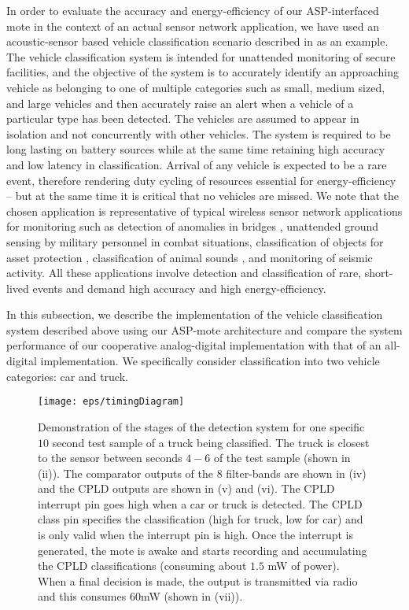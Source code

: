 In order to evaluate the accuracy and energy-efficiency of our ASP-interfaced mote in the context of an actual sensor network application, we have used an acoustic-sensor based vehicle classification scenario described in \cite{lanl} as an example. The vehicle classification system is intended for unattended monitoring of secure facilities, and the objective of the system is to accurately identify an approaching vehicle as belonging to one of multiple categories such as small, medium sized, and large vehicles and then accurately raise an alert when a vehicle of a particular type has been detected. The vehicles are assumed to appear in isolation and not concurrently with other vehicles. The system is required to be long lasting on battery sources while at the same time retaining high accuracy and low latency in classification. Arrival of any vehicle is expected to be a rare event, therefore rendering duty cycling of resources essential for energy-efficiency -- but at the same time it is critical that no vehicles are missed. We note that the chosen application is representative of typical wireless sensor network applications for monitoring such as detection of anomalies in bridges \cite{struct_rice}, unattended ground sensing by military personnel in combat situations, classification of objects for asset protection \cite{lites}, classification of animal sounds \cite{acoustic_frogs}, and monitoring of seismic activity. All these applications involve detection and classification of rare, short-lived events and demand high accuracy and high energy-efficiency. 

In this subsection, we describe the implementation of the vehicle classification system described above using our ASP-mote architecture and compare the system performance of our cooperative analog-digital implementation with that of an all-digital implementation. We specifically consider classification into two vehicle categories: car and truck.

\begin{figure}[tp]
  \begin{center}
    \texttt{[image: eps/timingDiagram]}
    \caption{Demonstration of the stages of the detection system for one specific $10$ second test sample of a truck being classified. The truck is closest to the sensor between seconds $4-6$ of the test sample (shown in (ii)). The comparator outputs of the $8$ filter-bands are shown in (iv) and the CPLD outputs are shown in (v) and (vi). The CPLD interrupt pin goes high when a car or truck is detected. The CPLD class pin specifies the classification (high for truck, low for car) and is only valid when the interrupt pin is high.  Once the interrupt is generated, the mote is awake and starts recording and accumulating the CPLD classifications (consuming about $1.5$ mW of power). When a final decision is made, the output is transmitted via radio and this consumes $60$mW (shown in (vii)).}
    \label{truck}
  \end{center}
\end{figure}

